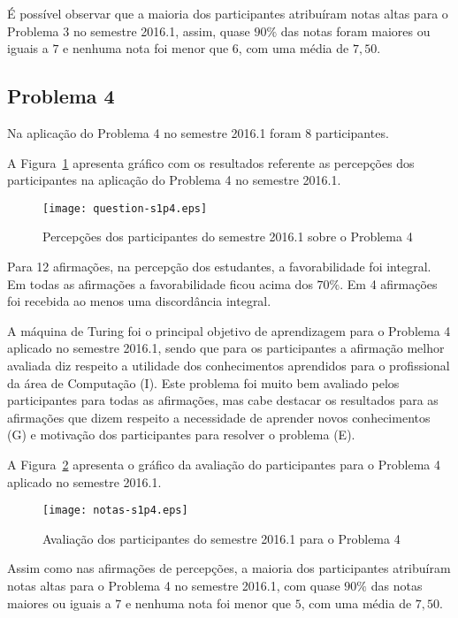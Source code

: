 É possível observar que a maioria dos participantes atribuíram
notas altas para o Problema 3 no semestre 2016.1, assim, quase $90\%$ das notas
foram maiores ou iguais a $7$ e nenhuma nota foi menor que $6$, com uma média
de $7,50$.

\subsection{Problema 4}
Na aplicação do Problema 4 no semestre 2016.1 foram 8 participantes.

A Figura~\ref{percep-s1p4} apresenta gráfico com os resultados referente
as percepções dos participantes na aplicação do
Problema 4 no semestre 2016.1.

\begin{figure}[!htb]
\centering
\texttt{[image: question-s1p4.eps]}
\caption{Percepções dos participantes do semestre 2016.1 sobre o Problema 4}
\label{percep-s1p4}
\end{figure}

Para 12 afirmações, na percepção dos estudantes, a favorabilidade foi integral.
Em todas as afirmações a favorabilidade ficou acima dos $70\%$.
Em 4 afirmações foi recebida ao menos uma discordância integral.

A máquina de Turing foi o principal objetivo de aprendizagem para o Problema 4
aplicado no semestre 2016.1, sendo que para os participantes a afirmação
melhor avaliada diz respeito a utilidade dos conhecimentos aprendidos para 
o profissional da área de Computação (I).
Este problema foi muito bem avaliado pelos participantes para todas
as afirmações, mas cabe destacar os resultados para as afirmações que
dizem respeito a necessidade de aprender novos conhecimentos (G) e
motivação dos participantes para resolver o problema (E).

A Figura~\ref{aval-s1p4} apresenta o gráfico da
avaliação do participantes para o Problema 4 aplicado no semestre 2016.1.

\begin{figure}[!htb]
\centering
\texttt{[image: notas-s1p4.eps]}
\caption{Avaliação dos participantes do semestre 2016.1 para o Problema 4}
\label{aval-s1p4}
\end{figure}

Assim como nas afirmações de percepções, a maioria dos participantes
atribuíram notas altas para o Problema 4 no semestre 2016.1,
com quase $90\%$ das notas maiores ou iguais a $7$ e nenhuma nota
foi menor que $5$, com uma média de $7,50$.

